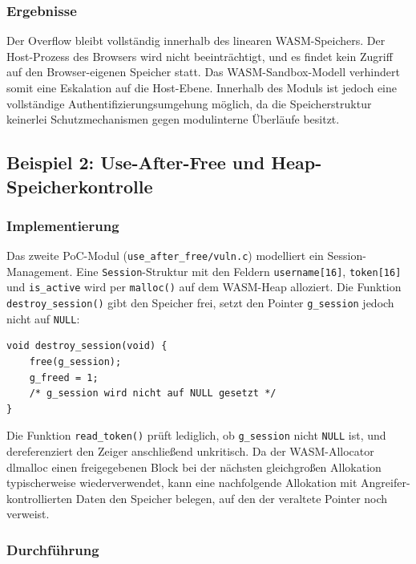 \subsubsection{Ergebnisse}

Der Overflow bleibt vollständig innerhalb des linearen WASM-Speichers. Der Host-Prozess des Browsers wird nicht beeinträchtigt, und es findet kein Zugriff auf den Browser-eigenen Speicher statt. Das WASM-Sandbox-Modell verhindert somit eine Eskalation auf die Host-Ebene. Innerhalb des Moduls ist jedoch eine vollständige Authentifizierungsumgehung möglich, da die Speicherstruktur keinerlei Schutzmechanismen gegen modulinterne Überläufe besitzt.

\subsection{Beispiel 2: Use-After-Free und Heap-Speicherkontrolle}

\subsubsection{Implementierung}

Das zweite PoC-Modul (\texttt{use\_after\_free/vuln.c}) modelliert ein Session-Management. Eine \texttt{Session}-Struktur mit den Feldern \texttt{username[16]}, \texttt{token[16]} und \texttt{is\_active} wird per \texttt{malloc()} auf dem WASM-Heap alloziert. Die Funktion \texttt{destroy\_session()} gibt den Speicher frei, setzt den Pointer \texttt{g\_session} jedoch nicht auf \texttt{NULL}:

\begin{verbatim}
void destroy_session(void) {
    free(g_session);
    g_freed = 1;
    /* g_session wird nicht auf NULL gesetzt */
}
\end{verbatim}

Die Funktion \texttt{read\_token()} prüft lediglich, ob \texttt{g\_session} nicht \texttt{NULL} ist, und dereferenziert den Zeiger anschließend unkritisch. Da der WASM-Allocator dlmalloc einen freigegebenen Block bei der nächsten gleichgroßen Allokation typischerweise wiederverwendet, kann eine nachfolgende Allokation mit Angreifer-kontrollierten Daten den Speicher belegen, auf den der veraltete Pointer noch verweist.

\subsubsection{Durchführung}

